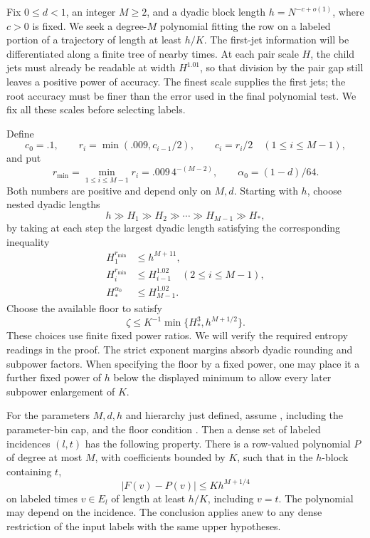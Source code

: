 Fix \(0\le d<1\), an integer \(M\ge2\), and a dyadic block length
\(h=N^{-c+o(1)}\), where \(c>0\) is fixed.  We seek a degree-\(M\)
polynomial fitting the row on a labeled portion of a trajectory of
length at least \(h/K\).  The first-jet
information will be differentiated along a finite tree of nearby times.
At each pair scale \(H\), the child jets must already be readable at
width \(H^{1.01}\), so that division by the pair gap still leaves a
positive power of accuracy.  The finest scale supplies the first jets;
the root accuracy must be finer than the error used in the final
polynomial test.  We fix all these scales before selecting labels.

Define
\[
 c_0=.1,\qquad
 r_i=\min(.009,c_{i-1}/2),\qquad c_i=r_i/2
 \quad(1\le i\le M-1),
\]
and put
\[
 r_{\min}=\min_{1\le i\le M-1}r_i
          =.009\,4^{-(M-2)},\qquad
 \alpha_0=(1-d)/64.
\]
Both numbers are positive and depend only on \(M,d\).
Starting with \(h\), choose nested dyadic lengths
\[
 h\gg H_1\gg H_2\gg\cdots\gg H_{M-1}\gg H_*,
\]
by taking at each step the largest dyadic length satisfying the
corresponding inequality
\begin{equation}\label{a04:jet-scale-schedule}
 \begin{split}
 H_1^{r_{\min}}&\le h^{M+11},\\
 H_i^{r_{\min}}&\le H_{i-1}^{1.02}
                  \quad(2\le i\le M-1),\\
 H_*^{\alpha_0}&\le H_{M-1}^{1.02}.
 \end{split}
\end{equation}
Choose the available floor to satisfy
\begin{equation}\label{a04:jet-floor}
 \zeta\le K^{-1}\min\{H_*^3,h^{M+1/2}\}.
\end{equation}
These choices use finite fixed power ratios.  We will verify the
required entropy readings in the proof.  The strict exponent margins
absorb dyadic rounding and subpower factors.  When specifying the floor
by a fixed power, one may place it a further fixed power of \(h\) below
the displayed minimum to allow every later subpower enlargement of
\(K\).

\begin{proposition}\label{prop:higher-jets}
For the parameters \(M,d,h\) and hierarchy just defined, assume
, including the parameter-bin cap, and the floor
condition .  Then a dense set of labeled incidences
\((l,t)\) has the following property.
There is a row-valued polynomial \(P\) of degree at most \(M\), with
coefficients bounded by \(K\), such that in the \(h\)-block containing
\(t\),
\[
 |F(v)-P(v)|\le Kh^{M+1/4}
\]
on labeled times \(v\in E_l\) of length at least \(h/K\), including \(v=t\).
The polynomial may depend on the incidence.
The conclusion applies anew to any dense restriction of the input
labels with the same upper hypotheses.
\end{proposition}

